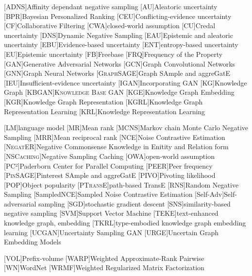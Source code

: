 \begin{acronym}[ECU]
[\textsc{ADNS}]{Affinity dependant negative sampling}
[AU]{Aleatoric uncertainty}
[BPR]{Bayesian Personalized Ranking}
[CEU]{Conflicting-evidence uncertainty}
[CF]{Collaborative Filtering}
[CWA]{closed-world assumption}
[CU]{Credal uncertainty}
[DNS]{Dynamic Negative Sampling}
[EAU]{Epistemic and aleatoric uncertainty}
[EBU]{Evidence-based uncertainty}
[ENT]{entropy-based uncertainty}
[EU]{Epistemic uncertainty}
[\textsc{FB}]{Freebase}
[\textsc{FRQ}]{Frequency of the Property}
[GAN]{Generative Adversarial Networks}
[GCN]{Graph Convolutional Networks}
[GNN]{Graph Neural Networks}
[\textsc{GraphSAGE}]{Graph SAmple and aggreGatE}
[IEU]{Insufficient-evidence uncertainty}
[\textsc{IGAN}]{Incorporating GAN}
[KG]{Knowledge Graph}
[\textsc{KBGAN}]{\textsc{Knowledge Base GAN}}
[KGE]{Knowledge Graph Embedding}
[KGR]{Knowledge Graph Representation}
[KGRL]{Knowledge Graph Representation Learning}
[KRL]{Knowledge Representation Learning}

[LM]{language model}
[MR]{Mean rank}
[\textsc{MCNS}]{Markov chain Monte Carlo Negative Sampling}
[MRR]{Mean reciprocal rank}
[NCE]{Noise Contrastive Estimation}
[\textsc{NegatER}]{Negative Commonsense Knowledge in Enitity and Relation form}
[\textsc{NSCaching}]{Negative Sampling Caching}
[OWA]{open-world assumption}
[PC²]{Paderborn Center for Parallel Computing}
[\textsc{PEER}]{Peer frequency}
[\textsc{PinSAGE}]{Pinterest SAmple and aggreGatE}
[\textsc{PIVO}]{Pivoting likelihood}
[\textsc{POP}]{Object popularity}
[\textsc{PTransE}]{path-based TransE}
[RNS]{Random Negative Sampling}
[SampledNCE]{Sampled Noise Contrastive Estimation}
[Self-Adv]{Self-adversarial sampling}
[SGD]{stochastic gradient descent}
[SNS]{similarity-based negative sampling}
[SVM]{Support Vector Machine}
[\textsc{TEKE}]{text-enhanced knowledge graph, embedding}
[\textsc{TKRL}]{type-embodied knowledge graph embedding learning}
[\textsc{UCGAN}]{Uncertainty Sampling GAN}
[\textsc{URGE}]{Uncertain Graph Embedding Models}

[\textsc{VOL}]{Prefix-volume}
[WARP]{Weighted Approximate-Rank Pairwise}
[\textsc{WN}]{WordNet}
[WRMF]{Weighted Regularized Matrix Factorization}
\end{acronym}